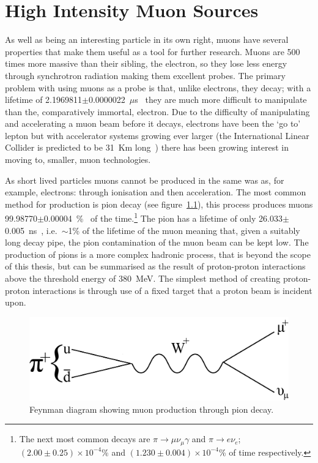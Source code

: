 \chapter{High Intensity Muon Sources} %
\label{cha:high_intensity_muon_sources}
As well as being an interesting particle in its own right, muons have several properties that make them useful as a tool for further research. Muons are 500 times more massive than their sibling, the electron, so they lose less energy through synchrotron radiation making them excellent probes. The primary problem with using muons as a probe is that, unlike electrons, they decay; with a lifetime of 2.1969811\( \pm \)0.0000022~\( \mu \)s~\cite{PDG for muons} they are much more difficult to manipulate than the, comparatively immortal, electron. Due to the difficulty of manipulating and accelerating a muon beam before it decays, electrons have been the `go to' lepton but with accelerator systems growing ever larger (the International Linear Collider is predicted to be 31~Km long~\cite{International Linear Collider ref}) there has been growing interest in moving to, smaller, muon technologies. 

As short lived particles muons cannot be produced in the same was as, for example, electrons: through ionisation and then acceleration. The most common method for production is pion decay (see figure~\ref{fig:pion_decay_feyman}), this process produces muons 99.98770$\pm$0.00004~\%~\cite{PDG CITATION PLEASE} of the time.\footnote{The next most common decays are \( \pi\rightarrow\mu\nu_{\mu}\gamma \) and \( \pi\rightarrow e \nu_e \); \( (2.00\pm0.25)\times10^{-4} \)\% and \( (1.230\pm0.004)\times10^{-4} \)\% of time respectively.} The pion has a lifetime of only 26.033\(\pm\)0.005~ns~\cite{PDG for pions}, i.e.\ \( \sim \)1\% of the lifetime of the muon meaning that, given a suitably long decay pipe, the pion contamination of the muon beam can be kept low. The production of pions is a more complex hadronic process, that is beyond the scope of this thesis, but can be summarised as the result of proton-proton interactions above the threshold energy of 380~MeV. The simplest method of creating proton-proton interactions is through use of a fixed target that a proton beam is incident upon.

\begin{figure}[hptb]
  \centering  
    \includegraphics[scale=0.8]{images/pion_decay_feyman.png}
  \caption{Feynman diagram showing muon production through pion decay.}
  \label{fig:pion_decay_feyman}
\end{figure}

